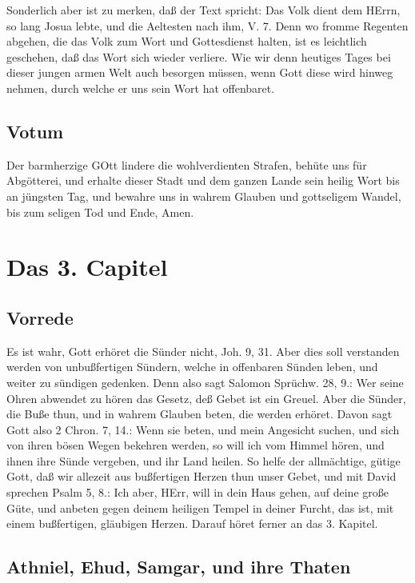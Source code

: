 Sonderlich aber ist zu merken, daß der Text spricht: Das Volk dient dem HErrn, so lang Josua lebte, und die Aeltesten nach ihm, V. 7. Denn wo fromme Regenten abgehen, die das Volk zum Wort und Gottesdienst halten, ist es leichtlich geschehen, daß das Wort sich wieder verliere. Wie wir denn heutiges Tages bei dieser jungen armen Welt auch besorgen müssen, wenn Gott diese wird hinweg nehmen, durch welche er uns sein Wort hat offenbaret.

\section{Votum}

Der barmherzige GOtt lindere die wohlverdienten Strafen, behüte uns für Abgötterei, und erhalte dieser Stadt und dem ganzen Lande sein heilig Wort bis an jüngsten Tag, und bewahre uns in wahrem Glauben und gottseligem Wandel, bis zum seligen Tod und Ende, Amen.

\chapter{Das 3. Capitel}

\section{Vorrede}

Es ist wahr, Gott erhöret die Sünder nicht, Joh. 9, 31. Aber dies soll verstanden werden von unbußfertigen Sündern, welche in offenbaren Sünden leben, und weiter zu sündigen gedenken. Denn also sagt Salomon Sprüchw. 28, 9.: Wer seine Ohren abwendet zu hören das Gesetz, deß Gebet ist ein Greuel. Aber die Sünder, die Buße thun, und in wahrem Glauben beten, die werden erhöret. Davon sagt Gott also 2 Chron. 7, 14.: Wenn sie beten, und mein Angesicht suchen, und sich von ihren bösen Wegen bekehren werden, so will ich vom
Himmel hören, und ihnen ihre Sünde vergeben, und ihr Land heilen. So helfe der allmächtige, gütige Gott, daß wir allezeit aus bußfertigen Herzen thun unser Gebet, und mit David sprechen Psalm 5, 8.: Ich aber, HErr, will in dein Haus gehen, auf deine große Güte, und anbeten gegen deinem heiligen Tempel in deiner Furcht, das ist, mit einem bußfertigen, gläubigen Herzen. Darauf höret ferner an das 3. Kapitel.

\section{Athniel, Ehud, Samgar, und ihre Thaten}

